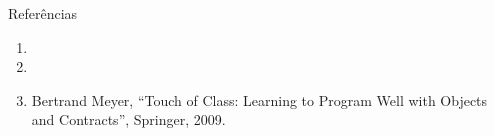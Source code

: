 \begin{frame}{Referências}  
  \begin{enumerate}
  \item \ianref
  \item \pfref
  \item Bertrand Meyer, ``Touch of Class: Learning to Program Well
    with Objects and Contracts'', Springer, 2009.
  \end{enumerate}
\end{frame}